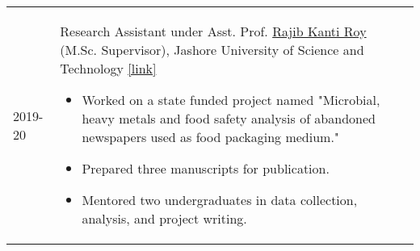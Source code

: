 
\begin{longtable}[l]{@{}p{} p{}}
    2019-20 & Research Assistant under Asst. Prof. \href{https://just.edu.bd/t/teacher-1549448214343}{Rajib Kanti Roy} (M.Sc. Supervisor), Jashore University of Science and Technology \href{https://1drv.ms/b/c/919fe16e04062443/EUMkBgRu4Z8ggJGJYAAAAAABTrgzcQmgxLyzuh6e_xyYNQ?e=mmSRTM}{[link]}
    \setlength{\leftmargini}{1em}
    \begin{itemize}
    \item Worked on a state funded project named "Microbial, heavy metals and food safety analysis of abandoned newspapers used as food packaging medium." 
    \item Prepared three manuscripts for publication. 
    \item Mentored two undergraduates in data collection, analysis, and project writing. 
    \end{itemize}
    
\end{longtable}